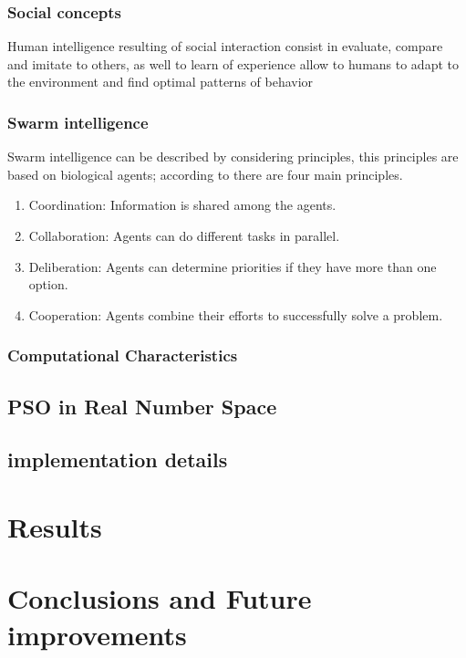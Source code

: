 \documentclass[journal]{IEEEtran}
\begin{document}
\subsubsection{ Social concepts }
Human intelligence resulting of social interaction consist in evaluate, compare and imitate to others, as well to learn of experience allow to humans to adapt to the environment and find optimal patterns of behavior

\subsubsection{ Swarm intelligence }
Swarm intelligence can be described by considering principles, this principles are based on biological agents; according to \cite{Garnier2007} there are four main principles.
\begin{enumerate}
    \item Coordination: Information is shared among the agents.
    \item Collaboration: Agents can do different tasks in parallel.
    \item Deliberation: Agents can determine priorities if they have more than one option.
    \item Cooperation: Agents combine their efforts to successfully solve a problem.
\end{enumerate}
\subsubsection{ Computational Characteristics }



\subsection{PSO in Real Number Space}


\subsection{implementation details} %

\section{Results}


\section{Conclusions and Future improvements}
\end{document}
